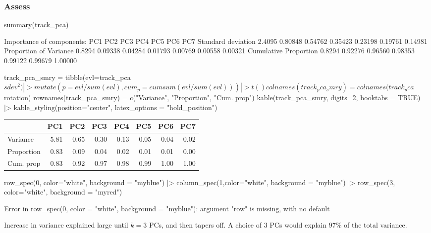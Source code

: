 \documentclass[a4paper]{article}\usepackage[]{graphicx}\usepackage[]{xcolor}
\begin{document}
\subsubsection{Assess}
\begin{Schunk}
\begin{Sinput}
summary(track_pca)
\end{Sinput}
\begin{Soutput}
Importance of components:
                          PC1     PC2     PC3     PC4     PC5     PC6     PC7
Standard deviation     2.4095 0.80848 0.54762 0.35423 0.23198 0.19761 0.14981
Proportion of Variance 0.8294 0.09338 0.04284 0.01793 0.00769 0.00558 0.00321
Cumulative Proportion  0.8294 0.92276 0.96560 0.98353 0.99122 0.99679 1.00000
\end{Soutput}
\begin{Sinput}
track_pca_smry = tibble(evl=track_pca$sdev^2) |>
  mutate(p = evl/sum(evl), cum_p = cumsum(evl/sum(evl))) |>t() 
colnames(track_pca_smry) = colnames(track_pca$rotation)
rownames(track_pca_smry) = c("Variance", "Proportion", "Cum. prop")
kable(track_pca_smry, digits=2, booktabs = TRUE) |>
  kable_styling(position="center", latex_options = "hold_position")
\end{Sinput}
\begin{table}[!h]
\centering
\begin{tabular}{lrrrrrrr}
\toprule
  & PC1 & PC2 & PC3 & PC4 & PC5 & PC6 & PC7\\
\midrule
Variance & 5.81 & 0.65 & 0.30 & 0.13 & 0.05 & 0.04 & 0.02\\
Proportion & 0.83 & 0.09 & 0.04 & 0.02 & 0.01 & 0.01 & 0.00\\
Cum. prop & 0.83 & 0.92 & 0.97 & 0.98 & 0.99 & 1.00 & 1.00\\
\bottomrule
\end{tabular}
\end{table}

\begin{Sinput}
  row_spec(0, color="white", background = "myblue") |>
  column_spec(1,color="white", background = "myblue") |>
  row_spec(3, color="white", background = "myred")
\end{Sinput}
\begin{Soutput}
Error in row_spec(0, color = "white", background = "myblue"): argument "row" is missing, with no default
\end{Soutput}
\end{Schunk}
Increase in variance explained large until \( k = 3 \) PCs, and then tapers off. A choice of \textcolor{myred}{3 PCs} would explain 97\% of the total variance.
\end{document}
